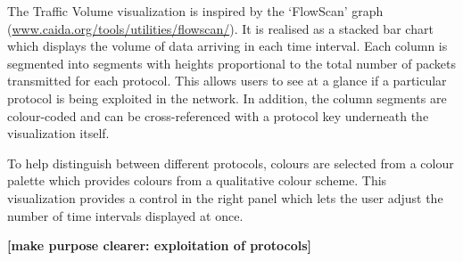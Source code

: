 The Traffic Volume visualization is inspired by the `FlowScan'
graph (\url{www.caida.org/tools/utilities/flowscan/}).
It is realised as a stacked bar chart which displays the volume of data arriving
in each time interval. Each column is segmented into segments with heights proportional to the total number of packets transmitted for each protocol. This allows users to see at a glance if a particular protocol is being exploited in the network. In addition,
the column segments are colour-coded and can be cross-referenced with a
protocol key underneath the visualization itself.

To help distinguish between different protocols, colours are selected from a colour
palette which provides colours from a qualitative colour scheme.
This visualization provides a control in the right panel which lets the user
adjust the number of time intervals displayed at once.

\textbf{[make purpose clearer: exploitation of protocols]}